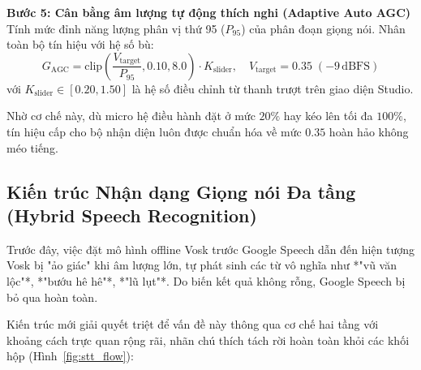 \vspace{1mm}
\noindent\textbf{Bước 5: Cân bằng âm lượng tự động thích nghi (Adaptive Auto AGC)}\\
Tính mức đỉnh năng lượng phân vị thứ 95 ($P_{95}$) của phân đoạn giọng nói. Nhân toàn bộ tín hiệu với hệ số bù:
\begin{equation}
G_{\text{AGC}} = \text{clip}\left(\frac{V_{\text{target}}}{P_{95}}, 0.10, 8.0\right) \cdot K_{\text{slider}}, \quad V_{\text{target}} = 0.35 \; (-9\,\text{dBFS})
\end{equation}
với $K_{\text{slider}} \in [0.20, 1.50]$ là hệ số điều chỉnh từ thanh trượt trên giao diện Studio.

\vspace{2mm}
Nhờ cơ chế này, dù micro hệ điều hành đặt ở mức $20\%$ hay kéo lên tối đa $100\%$, tín hiệu cấp cho bộ nhận diện luôn được chuẩn hóa về mức $0.35$ hoàn hảo không méo tiếng.

\subsection{Kiến trúc Nhận dạng Giọng nói Đa tầng (Hybrid Speech Recognition)}

Trước đây, việc đặt mô hình offline Vosk trước Google Speech dẫn đến hiện tượng Vosk bị "ảo giác" khi âm lượng lớn, tự phát sinh các từ vô nghĩa như *"vũ văn lộc"*, *"bướu hê hê"*, *"lũ lụt"*. Do biến kết quả không rỗng, Google Speech bị bỏ qua hoàn toàn.

Kiến trúc mới giải quyết triệt để vấn đề này thông qua cơ chế hai tầng với khoảng cách trực quan rộng rãi, nhãn chú thích tách rời hoàn toàn khỏi các khối hộp (Hình~\ref{fig:stt_flow}):

